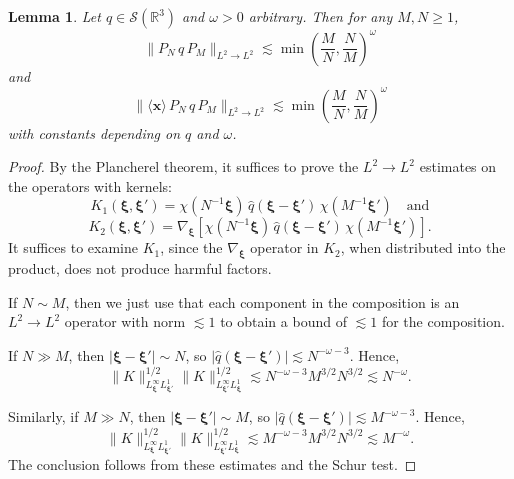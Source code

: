 \documentclass[12pt,letterpaper]{amsart}
\newcommand{\la}{\langle}
\newcommand{\ra}{\rangle}
\newtheorem{lemma}[theorem]{Lemma}
\theoremstyle{remark}
\numberwithin{equation}{section}
\numberwithin{theorem}{section}
\numberwithin{table}{section}
\begin{document}
\begin{lemma}
\label{L:weight-est}
Let  $q\in \mathcal{S}(\mathbb{R}^3)$ and $\omega>0$ arbitrary. Then for any $M,N \geq 1$, 
$$
\| P_N \, q \, P_M \|_{L^2\to L^2} \lesssim  \min \left(\frac{M}{N}, \frac{N}{M}\right)^\omega
$$
and
$$
\| \la \mathbf{x}  \ra \, P_N \, q \, P_M \|_{L^2\to L^2} \lesssim \min \left(\frac{M}{N}, \frac{N}{M}\right)^\omega
$$
with constants depending on $q$ and $\omega$.
\end{lemma}
\begin{proof}
By the Plancherel theorem, it suffices to prove the $L^2\to L^2$ estimates on the operators with kernels:
$$
K_1(\boldsymbol{\xi},\boldsymbol{\xi}') = \chi(N^{-1} \boldsymbol{\xi}) \, \hat q( \boldsymbol{\xi} - \boldsymbol{\xi}') \, \chi(M^{-1} \boldsymbol{\xi}') \quad \mbox{and}
$$
$$
K_2(\boldsymbol{\xi},\boldsymbol{\xi}') = \nabla_{\boldsymbol{\xi}}  [\chi(N^{-1} \boldsymbol{\xi}) \, \hat q( \boldsymbol{\xi} - \boldsymbol{\xi}') \, \chi(M^{-1} \boldsymbol{\xi}')].
$$
It suffices to examine $K_1$, since the $\nabla_{\boldsymbol{\xi}}$ operator in $K_2$, when distributed into the product, does not produce harmful factors.  

If $N\sim M$, then we just use that each component in the composition is an $L^2\to L^2$ operator with norm $\lesssim 1$ to obtain a bound of $\lesssim 1$ for the composition. 


If $N\gg M$, then $|\boldsymbol{\xi} - \boldsymbol{\xi}'| \sim N$, so $|\hat q(\boldsymbol{\xi}-\boldsymbol{\xi}')| \lesssim N^{-\omega-3}$. Hence,
$$
\| K \|_{L_{\boldsymbol{\xi}}^\infty L_{\boldsymbol{\xi}'}^1}^{1/2} \| K \|_{L_{\boldsymbol{\xi}'}^\infty L_{\boldsymbol{\xi}}^1}^{1/2} \lesssim N^{-\omega-3} M^{3/2}N^{3/2} \lesssim N^{-\omega}.
$$

Similarly, if $M \gg N$, then $|\boldsymbol{\xi} - \boldsymbol{\xi}'| \sim M$, so $|\hat q(\boldsymbol{\xi}-\boldsymbol{\xi}')| \lesssim M^{-\omega-3}$. Hence,
$$
\| K \|_{L_{\boldsymbol{\xi}}^\infty L_{\boldsymbol{\xi}'}^1}^{1/2} \| K \|_{L_{\boldsymbol{\xi}'}^\infty L_{\boldsymbol{\xi}}^1}^{1/2} \lesssim M^{-\omega-3} M^{3/2}N^{3/2} \lesssim M^{-\omega}.
$$
The conclusion follows from these estimates and the Schur test.
\end{proof}
\end{document}
